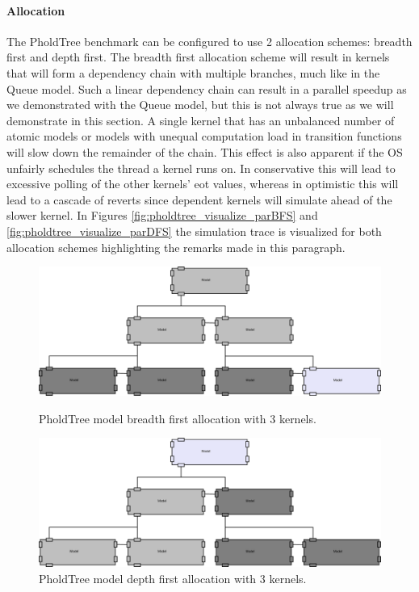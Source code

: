 \paragraph*{Allocation}\label{PholdTreeallocation}
The PholdTree benchmark can be configured to use 2 allocation schemes: breadth first and depth first. 
The breadth first allocation scheme will result in kernels that will form a dependency chain with multiple branches, much like in the Queue model. 
Such a linear dependency chain can result in a parallel speedup as we demonstrated with the Queue model, but this is not always true as we will demonstrate in this section. 
A single kernel that has an unbalanced number of atomic models or models with unequal computation load in transition functions will slow down the remainder of the chain. This effect is also apparent if the OS unfairly schedules the thread a kernel runs on. In conservative this will lead to excessive polling of the other kernels' eot values, whereas in optimistic this will lead to a cascade of reverts since dependent kernels will simulate ahead of the slower kernel. In Figures \ref{fig:pholdtree_visualize_parBFS} and \ref{fig:pholdtree_visualize_parDFS} the simulation trace is visualized for both allocation schemes highlighting the remarks made in this paragraph.

\begin{figure}
	\center
	
	\includegraphics[width=\modelfraction\columnwidth]{fig/pholdtreeBFS.eps}
	\caption{PholdTree model breadth first allocation with 3 kernels.}
	\label{fig:PholdTree_model_bfs}
	
	\includegraphics[width=\modelfraction\columnwidth]{fig/pholdtreeDFS.eps}
	\caption{PholdTree model depth first allocation with 3 kernels.}
	\label{fig:PholdTree_model_dfs}
\end{figure}

